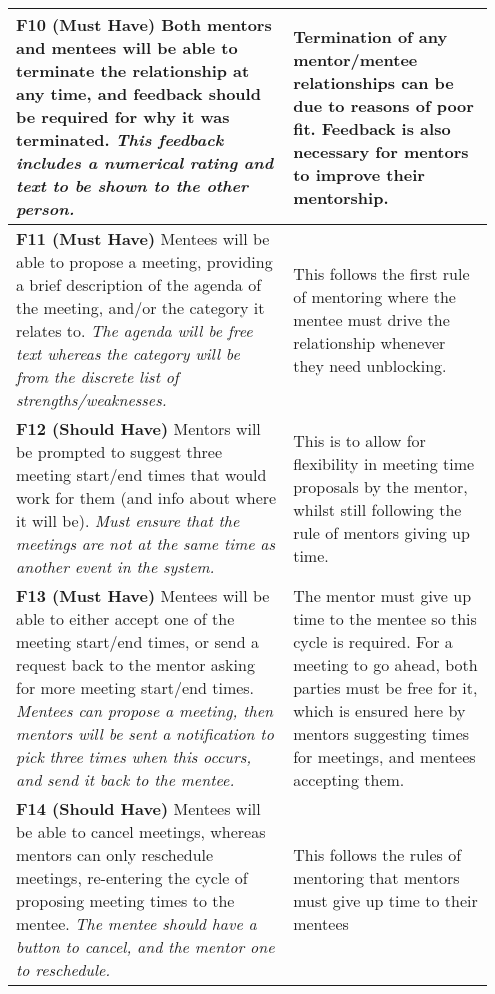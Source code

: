 \documentclass[10pt]{article}
\begin{document}
\begin{longtable}{|p{0.55\linewidth}|p{0.4\linewidth}|}
    \textbf{F10 (Must Have) }
    Both mentors and mentees will be able to terminate the relationship at any
    time, and feedback should be required for why it was terminated.
    \textit{This feedback includes a numerical rating and text to be shown to
    the other person.}
        &
    Termination of any mentor/mentee relationships can be due to reasons of poor
    fit. Feedback is also necessary for mentors to improve their mentorship.
    \\ \hline

    \textbf{F11 (Must Have) }
    Mentees will be able to propose a meeting, providing a brief description of
    the agenda of the meeting, and/or the category it relates to.
    \textit{The agenda will be free text whereas the category will be from the
    discrete list of strengths/weaknesses.}
        &
    This follows the first rule of mentoring where the mentee must drive the
    relationship whenever they need unblocking.
    \\ \hline

    \textbf{F12 (Should Have) }
    Mentors will be prompted to suggest three meeting start/end times that would
    work for them (and info about where it will be).
    \textit{Must ensure that the meetings are not at the same time as another
    event in the system.}
        &
    This is to allow for flexibility in meeting time proposals by the mentor,
    whilst still following the rule of mentors giving up time.
    \\ \hline

    \textbf{F13 (Must Have) }
    Mentees will be able to either accept one of the meeting start/end times, or
    send a request back to the mentor asking for more meeting start/end times.
    \textit{Mentees can propose a meeting, then mentors will be sent a
    notification to pick three times when this occurs, and send it back to the
    mentee.}
        &
    The mentor must give up time to the mentee so this cycle is required. For a
    meeting to go ahead, both parties must be free for it, which is ensured here
    by mentors suggesting times for meetings, and mentees accepting them.
    \\ \hline

    \textbf{F14 (Should Have) }
    Mentees will be able to cancel meetings, whereas mentors can only reschedule
    meetings, re-entering the cycle of proposing meeting times to the mentee.
    \textit{The mentee should have a button to cancel, and the mentor one to
    reschedule.}
        &
    This follows the rules of mentoring that mentors must give up time to their
    mentees
    \\ \hline


\end{longtable}
\end{document}

